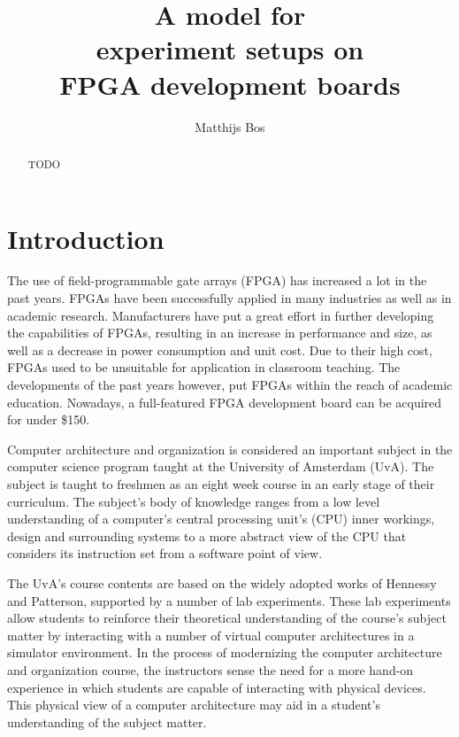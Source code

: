 \documentclass[openright]{uva-bachelor-thesis}
\title{A model for \\experiment setups on\\ FPGA development boards}
\author{Matthijs Bos}
\begin{document}
 

\maketitle

\begin{abstract}
TODO
\end{abstract}

\tableofcontents

\chapter{Introduction}
\label{chapterintroduction}
The use of field-programmable gate arrays (FPGA) has increased a lot in the past years. FPGAs have been successfully applied in many industries as well as in academic research. Manufacturers have put a great effort in further developing the capabilities of FPGAs, resulting in an increase in performance and size, as well as a decrease in power consumption and unit cost. Due to their high cost, FPGAs used to be unsuitable for application in classroom teaching. The developments of the past years however, put FPGAs within the reach of academic education. Nowadays, a full-featured FPGA development board can be acquired for under \$150. 

Computer architecture and organization is considered an important subject in the computer science program taught at the University of Amsterdam (UvA). The subject is taught to freshmen as an eight week course in an early stage of their curriculum. The subject's body of knowledge ranges from a low level understanding of a computer's central processing unit's (CPU) inner workings, design and surrounding systems to a more abstract view of the CPU that considers its instruction set from a software point of view.

The UvA's course contents are based on the widely adopted works of Hennessy and Patterson, supported by a number of lab experiments. These lab experiments allow students to reinforce their theoretical understanding of the course's subject matter by interacting with a number of virtual computer architectures in a simulator environment. In the process of modernizing the computer architecture and organization course, the instructors sense the need for a more hand-on experience in which students are capable of interacting with physical devices. This physical view of a computer architecture may aid in a student's understanding of the subject matter.
\end{document}
